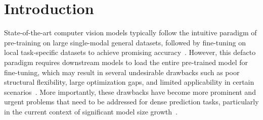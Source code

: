 \section{Introduction}
\label{sec:intro}
State-of-the-art computer vision models typically follow the intuitive paradigm of pre-training on large single-modal general datasets, followed by fine-tuning on local task-specific datasets to achieve promising accuracy~\citep{chen2021pre,zhang2024boundary,radford2021learning,he2022masked,zhang2023cae}. 
However, this defacto paradigm requires downstream models to load the entire pre-trained model for fine-tuning, which may result in several undesirable drawbacks such as poor structural flexibility, large optimization gaps, and limited applicability in certain scenarios~\citep{jie2023fact,du2022survey,jie2022convolutional}. More importantly, these drawbacks have become more prominent and urgent problems that need to be addressed for dense prediction tasks, particularly in the current context of significant model size growth~\citep{gao2023clip,zhang2022unabridged,radford2021learning,zhang2023cae,Kirillov_2023_ICCV}.

